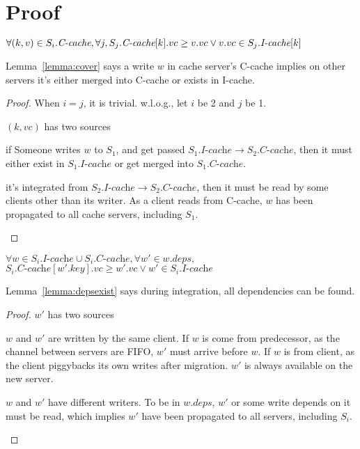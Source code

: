 \section{Proof}\label{s:appendix}
\newcommand{\black}{I-cache\xspace}
\newcommand{\white}{C-cache\xspace}
\begin{lemma}\label{lemma:cover}
$
\forall (k, v) \in S_i.\textit{\white{}}, \forall j, \\
S_j.\textit{\white{}}[k].vc \ge v.vc \lor v.vc \in S_j.\textit{\black{}}[k]
$
\end{lemma}

Lemma~\ref{lemma:cover} says a write $w$ in cache server's \white{} implies on other servers it's either merged into \white{} or exists in \black{}.

\begin{proof}
When $i = j$, it is trivial. w.l.o.g., let $i$ be 2 and $j$ be 1.

$(k, vc)$ has two sources
\begin{myenumerate2}
    \item if Someone writes $w$ to $S_1$, and get passed $S_1.\textit{\black{}} \to S_2.\textit{\white{}}$,
      then it must either exist in $S_1.\textit{\black{}}$ or get merged into $S_1.\textit{\white{}}$.
    \item it's integrated from $S_2.\textit{\black{}} \to S_2.\textit{\white{}}$, then it must be
      read by some clients other than its writer. As a client reads from \white{}, $w$ has been
      propagated to all cache servers, including $S_1$.
\end{myenumerate2}
\end{proof}

\begin{lemma}\label{lemma:depsexist}
$\forall w \in S_i.\textit{\black{}} \cup S_i.\textit{\white{}}, \forall w' \in w.deps,$
$S_i.\textit{\white{}}[w'.key].vc \ge w'.vc \lor w' \in S_i.\textit{\black{}}$
\end{lemma}

Lemma~\ref{lemma:depsexist} says during integration, all dependencies can be found.
\begin{proof}
$w'$ has two sources
\begin{myenumerate2}
\item $w$ and $w'$ are written by the same client. If $w$ is come from predecessor, as the channel between servers are FIFO, $w'$ must arrive before $w$. If $w$ is from client, as the client piggybacks its own writes after migration. $w'$ is always available on the new server.
\item $w$ and $w'$ have different writers. To be in $w.deps$, $w'$ or some write depends on it must be read, which implies $w'$ have been propagated to all servers, including $S_i$.
\end{myenumerate2}
\end{proof}



